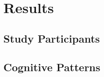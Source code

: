 \section{Results} \label{sec:results}

\subsection{Study Participants} \label{ssec:study_participants}

\subsection{Cognitive Patterns} \label{ssec:cognitive_patterns}
